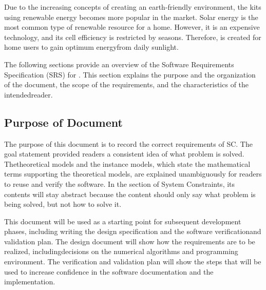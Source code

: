 \documentclass[12pt]{article}
\begin{document}
\medskip

Due to the increasing concepts of creating an earth-friendly environment, the
kits using renewable energy becomes more popular in the market. Solar energy is
the most common type of renewable resource for a home. However, it is an
expensive technology, and its cell efficiency is restricted by
seasons. Therefore, \progname is created for home users to gain optimum
energyfrom daily sunlight.


The following sections provide an overview of the Software Requirements
Specification (SRS) for \progname.  This section explains the purpose and the
organization of
the
document, the scope of the requirements, and the characteristics of the
intendedreader. 




\subsection{Purpose of Document}

\medskip

The purpose of this document is to record the correct requirements of SC. The
goal statement provided readers a consistent idea of what problem is solved.
Thetheoretical models and the instance models, which state the mathematical
terms
supporting the theoretical models, are explained unambiguously for readers to
reuse and verify the software. In the section of System Constraints, its
contents will stay abstract because the content should only say what problem is
being solved, but not how to solve it.

This document will be used as a starting point for subsequent development
phases, including writing the design specification and the software
verificationand validation plan.
The design document will show how the requirements are to be realized,
includingdecisions
on the numerical algorithms and programming environment. The verification and
validation
plan will show the steps that will be used to increase confidence in the
software documentation and the implementation.
\end{document}
